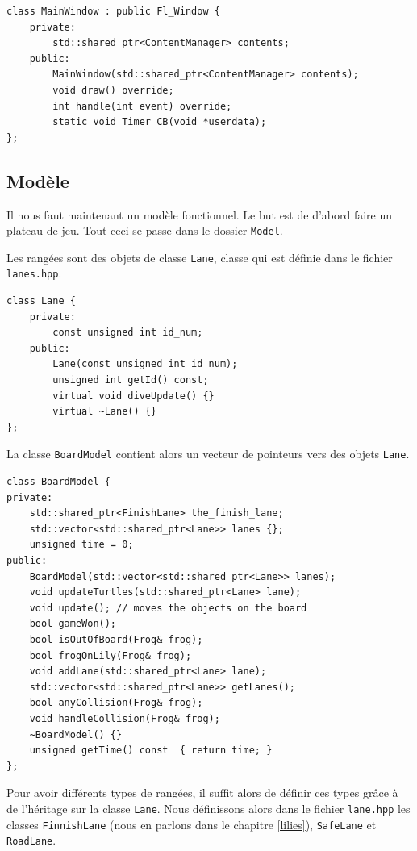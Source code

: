 \documentclass[a4paper, 12pt]{article}
\begin{document}
\begin{lstlisting}
class MainWindow : public Fl_Window {
    private:
        std::shared_ptr<ContentManager> contents;
    public:
        MainWindow(std::shared_ptr<ContentManager> contents);
        void draw() override;
        int handle(int event) override;
        static void Timer_CB(void *userdata);
};
\end{lstlisting}

\subsection{Modèle}

Il nous faut maintenant un modèle fonctionnel. 
Le but est de d'abord faire un plateau de jeu.
Tout ceci se passe dans le dossier \texttt{Model}.

Les rangées sont des objets de classe \texttt{Lane}, 
classe qui est définie dans le fichier \texttt{lanes.hpp}.

\begin{lstlisting}
class Lane {
    private:
        const unsigned int id_num;
    public:
        Lane(const unsigned int id_num);
        unsigned int getId() const;
        virtual void diveUpdate() {}
        virtual ~Lane() {}
};  
\end{lstlisting}

La classe \texttt{BoardModel} contient alors un vecteur de pointeurs 
vers des objets \texttt{Lane}.

\begin{lstlisting}
class BoardModel {
private:
    std::shared_ptr<FinishLane> the_finish_lane;
    std::vector<std::shared_ptr<Lane>> lanes {};
    unsigned time = 0;
public:
    BoardModel(std::vector<std::shared_ptr<Lane>> lanes);
    void updateTurtles(std::shared_ptr<Lane> lane);
    void update(); // moves the objects on the board
    bool gameWon();
    bool isOutOfBoard(Frog& frog);
    bool frogOnLily(Frog& frog);
    void addLane(std::shared_ptr<Lane> lane);
    std::vector<std::shared_ptr<Lane>> getLanes();
    bool anyCollision(Frog& frog);
    void handleCollision(Frog& frog);
    ~BoardModel() {}
    unsigned getTime() const  { return time; }
};
\end{lstlisting}

Pour avoir différents types de rangées, 
il suffit alors de définir ces types grâce à de l'héritage sur la classe \texttt{Lane}. 
Nous définissons alors dans le fichier \texttt{lane.hpp} 
les classes \texttt{FinnishLane} (nous en parlons dans le chapitre \ref{lilies}), 
\texttt{SafeLane} et \texttt{RoadLane}.
\end{document}
